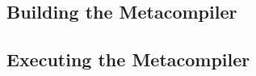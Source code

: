 

\subsection{Building the Metacompiler} %
\label{sub:building_the_metacompiler}


\subsection{Executing the Metacompiler} %
\label{sub:executing_the_metacompiler}


